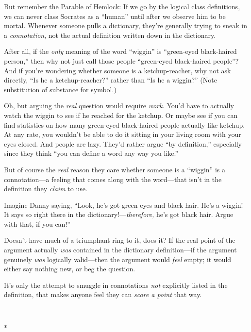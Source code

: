 {
 But remember the Parable of Hemlock: If we go by the logical class
definitions, we can never class Socrates as a
``human'' until after we observe him
to be mortal. Whenever someone pulls a dictionary,
they're generally trying to sneak in a
\textit{connotation}, not the actual definition written down in the
dictionary.}

{
 After all, if the \textit{only} meaning of the word
``wiggin'' is
``green-eyed black-haired person,''
then why not just call those people ``green-eyed
black-haired people''? And if you're
wondering whether someone is a ketchup-reacher, why not ask directly,
``Is he a ketchup-reacher?'' rather
than ``Is he a wiggin?'' (Note
substitution of substance for symbol.)}

{
 Oh, but arguing the \textit{real} question would require
\textit{work.} You'd have to actually watch the wiggin
to see if he reached for the ketchup. Or maybe see if you can find
statistics on how many green-eyed black-haired people actually like
ketchup. At any rate, you wouldn't be able to do it
sitting in your living room with your eyes closed. And people are lazy.
They'd rather argue ``by
definition,'' especially since they think
``you can define a word any way you
like.''}

{
 But of course the \textit{real} reason they care whether someone
is a ``wiggin'' is a connotation---a
feeling that comes along with the word---that isn't in
the definition they \textit{claim} to use.}

{
 Imagine Danny saying, ``Look,
he's got green eyes and black hair.
He's a wiggin! It says so right there in the
dictionary!---\textit{therefore,} he's got black hair.
Argue with that, if you can!''}

{
 Doesn't have much of a triumphant ring to it, does
it? If the real point of the argument actually \textit{was} contained
in the dictionary definition---if the argument genuinely \textit{was}
logically valid---then the argument would \textit{feel} empty; it would
either say nothing new, or beg the question.}

{
 It's only the attempt to smuggle in connotations
\textit{not} explicitly listed in the definition, that makes anyone
feel they can \textit{score a point} that way.}

{\centering
 \ ~
\par}

{\centering
 *
\par}


